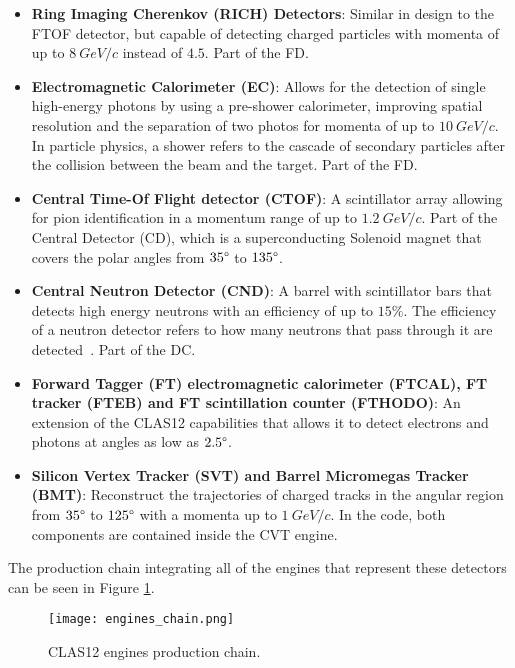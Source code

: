 \begin{itemize}
        \item \textbf{Ring Imaging Cherenkov (RICH) Detectors}: Similar in design to the FTOF detector, but capable of detecting charged particles with momenta of up to $8~GeV/c$ instead of $4.5$.
        Part of the FD.
        
        \item \textbf{Electromagnetic Calorimeter (EC)}: Allows for the detection of single high-energy photons by using a pre-shower calorimeter, improving spatial resolution and the separation of two photos for momenta of up to $10~GeV/c$.
        In particle physics, a shower refers to the cascade of secondary particles after the collision between the beam and the target.
        Part of the FD.
        
        \item \textbf{Central Time-Of Flight detector (CTOF)}: A scintillator array allowing for pion identification in a momentum range of up to $1.2~GeV/c$.
        Part of the Central Detector (CD), which is a superconducting Solenoid magnet that covers the polar angles from $35\degree$ to $135\degree$.
        
        \item \textbf{Central Neutron Detector (CND)}: A barrel with scintillator bars that detects high energy neutrons with an efficiency of up to $15\%$.
        The efficiency of a neutron detector refers to how many neutrons that pass through it are detected~\cite{pinchoff2005introduction}.
        Part of the DC.
        
        \item \textbf{Forward Tagger (FT) electromagnetic calorimeter (FTCAL), FT tracker (FTEB) and FT scintillation counter (FTHODO)}: An extension of the CLAS12 capabilities that allows it to detect electrons and photons at angles as low as $2.5\degree$.
        
        \item \textbf{Silicon Vertex Tracker (SVT) and Barrel Micromegas Tracker (BMT)}: Reconstruct the trajectories of charged tracks in the angular region from $35\degree$ to $125\degree$ with a momenta up to $1~GeV/c$.
        In the code, both components are contained inside the CVT engine.
    \end{itemize}

The production chain integrating all of the engines that represent these detectors can be seen in Figure \ref{fig:engines-chain}.

    \begin{figure}[h]
        \centering
        \texttt{[image: engines\_chain.png]}
        \caption{\label{fig:engines-chain} CLAS12 engines production chain.}
    \end{figure}
    
\newpage